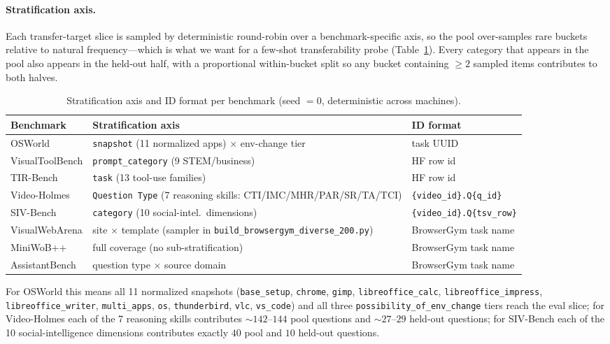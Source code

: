\paragraph{Stratification axis.}
Each transfer-target slice is sampled by deterministic round-robin over
a benchmark-specific axis, so the pool over-samples rare buckets
relative to natural frequency---which is what we want for a few-shot
transferability probe (Table~\ref{tab:bench-strata}). Every category
that appears in the pool also appears in the held-out half, with a
proportional within-bucket split so any bucket containing $\geq\!2$
sampled items contributes to both halves.

\begin{table}[t]
\centering
\small
\caption{Stratification axis and ID format per benchmark
(seed $=0$, deterministic across machines).}
\label{tab:bench-strata}
\renewcommand{\arraystretch}{1.10}
\begin{tabular}{@{}lll@{}}
\toprule
\textbf{Benchmark} & \textbf{Stratification axis} & \textbf{ID format} \\
\midrule
OSWorld          & \texttt{snapshot} (11 normalized apps) $\times$ env-change tier  & task UUID \\
VisualToolBench  & \texttt{prompt\_category} (9 STEM/business)                      & HF row id \\
TIR-Bench        & \texttt{task} (13 tool-use families)                             & HF row id \\
Video-Holmes     & \texttt{Question Type} (7 reasoning skills: CTI/IMC/MHR/PAR/SR/TA/TCI) & \texttt{\{video\_id\}.Q\{q\_id\}} \\
SIV-Bench        & \texttt{category} (10 social-intel.\ dimensions)                 & \texttt{\{video\_id\}.Q\{tsv\_row\}} \\
VisualWebArena   & site $\times$ template (sampler in \texttt{build\_browsergym\_diverse\_200.py}) & BrowserGym task name \\
MiniWoB++        & full coverage (no sub-stratification)                            & BrowserGym task name \\
AssistantBench   & question type $\times$ source domain                             & BrowserGym task name \\
\bottomrule
\end{tabular}
\end{table}

For OSWorld this means all 11 normalized snapshots
(\texttt{base\_setup}, \texttt{chrome}, \texttt{gimp},
\texttt{libreoffice\_calc}, \texttt{libreoffice\_impress},
\texttt{libreoffice\_writer}, \texttt{multi\_apps}, \texttt{os},
\texttt{thunderbird}, \texttt{vlc}, \texttt{vs\_code}) and all three
\texttt{possibility\_of\_env\_change} tiers reach the eval slice; for
Video-Holmes each of the 7 reasoning skills contributes
$\sim\!142$--$144$ pool questions and $\sim\!27$--$29$ held-out
questions; for SIV-Bench each of the 10 social-intelligence dimensions
contributes exactly $40$ pool and $10$ held-out questions.

